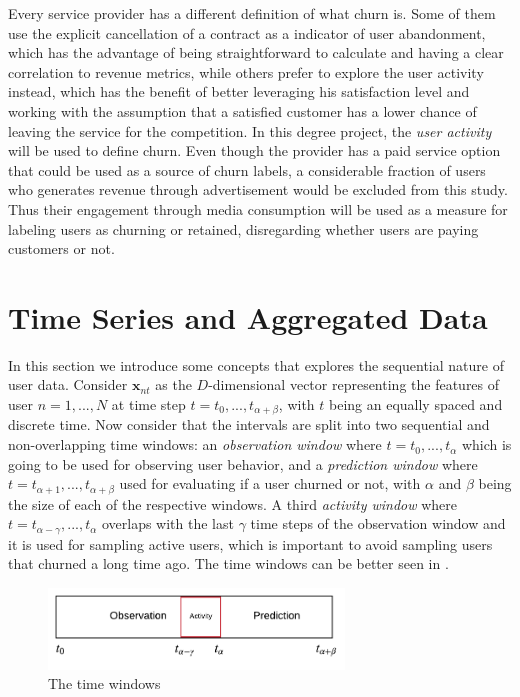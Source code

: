 \documentclass{kththesis}
\begin{document}
Every service provider has a different definition of what churn is. Some of them use the explicit cancellation of a contract as a indicator of user abandonment, which has the advantage of being straightforward to calculate and having a clear correlation to revenue metrics, while others prefer to explore the user activity instead, which has the benefit of better leveraging his satisfaction level and working with the assumption that a satisfied customer has a lower chance of leaving the service for the competition. In this degree project, the \emph{user activity} will be used to define churn. Even though the provider has a paid service option that could be used as a source of churn labels, a considerable fraction of users who generates revenue through advertisement would be excluded from this study. Thus their engagement through media consumption will be used as a measure for labeling users as churning or retained, disregarding whether users are paying customers or not.

\section{Time Series and Aggregated Data}
\label{sec:timewindows}

In this section we introduce some concepts that explores the sequential nature of user data. Consider $\mathbf{x}_{nt}$ as the $D$-dimensional vector representing the features of user $n=1,...,N$ at time step $t = t_0,...,t_{\alpha+\beta}$, with $t$ being an equally spaced and discrete time. Now consider that the intervals are split into two sequential and non-overlapping time windows: an \emph{observation window} where $t = t_0,...,t_\alpha$ which is going to be used for observing user behavior, and a \emph{prediction window} where $t = t_{\alpha+1},...,t_{\alpha+\beta}$ used for evaluating if a user churned or not, with $\alpha$ and $\beta$ being the size of each of the respective windows. A third \emph{activity window} where $t=t_{\alpha-\gamma},...,t_\alpha$ overlaps with the last $\gamma$ time steps of the observation window and it is used for sampling active users, which is important to avoid sampling users that churned a long time ago. The time windows can be better seen in .

\begin{figure}[h]
    \centering
    \includegraphics[width=0.7\textwidth,keepaspectratio]{figures/timewindows.pdf}
    \caption{The time windows}
    \label{fig:timewindows}
\end{figure}
\end{document}
